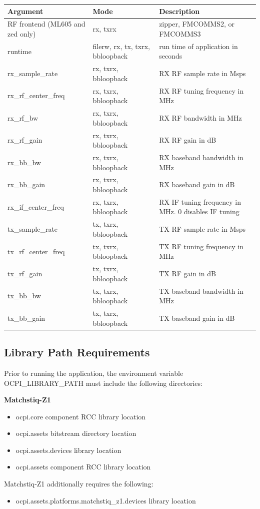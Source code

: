 \begin{tabular}{|l|l|l|}
\hline
\rowcolor{blue}
Argument & Mode & Description \\
\hline
RF frontend (ML605 and zed only) & rx, txrx & zipper, FMCOMMS2, or FMCOMMS3\\
\hline
runtime & filerw, rx, tx, txrx, bbloopback & run time of application in seconds\\
\hline
rx\_sample\_rate & rx, txrx, bbloopback & RX RF sample rate in Msps\\
\hline
rx\_rf\_center\_freq & rx, txrx, bbloopback & RX RF tuning frequency in MHz\\
\hline
rx\_rf\_bw & rx, txrx, bbloopback & RX RF bandwidth in MHz\\
\hline
rx\_rf\_gain & rx, txrx, bbloopback & RX RF gain in dB\\
\hline
rx\_bb\_bw & rx, txrx, bbloopback & RX baseband bandwidth in MHz\\
\hline
rx\_bb\_gain & rx, txrx, bbloopback & RX baseband gain in dB\\
\hline
rx\_if\_center\_freq & rx, txrx, bbloopback & RX IF tuning frequency in MHz. 0 disables IF tuning\\
\hline
tx\_sample\_rate & tx, txrx, bbloopback & TX RF sample rate in Msps\\
\hline
tx\_rf\_center\_freq & tx, txrx, bbloopback & TX RF tuning frequency in MHz\\
\hline
tx\_rf\_gain & tx, txrx, bbloopback & TX RF gain in dB\\
\hline
tx\_bb\_bw & tx, txrx, bbloopback & TX baseband bandwidth in MHz\\
\hline
tx\_bb\_gain & tx, txrx, bbloopback & TX baseband gain in dB\\
\hline
\end{tabular}\par\medskip

\pagebreak
\subsection{Library Path Requirements}
\noindent Prior to running the application, the environment variable OCPI\_LIBRARY\_PATH must include the following directories:\par\medskip
	\textbf{Matchstiq-Z1}
	\begin{itemize}
		\item ocpi.core component RCC library location
		\item ocpi.assets bitstream directory location
		\item ocpi.assets.devices library location
		\item ocpi.assets component RCC library location
	\end{itemize}
Matchstiq-Z1 additionally requires the following:
	\begin{itemize}
		\item ocpi.assets.platforms.matchstiq\_z1.devices library location
	\end{itemize}

